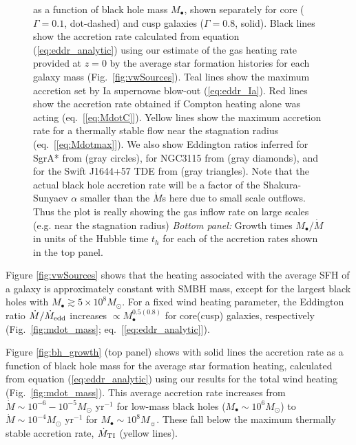 \documentclass[usenatbib,fleqn]{mn2e}
\newcommand{\Mdot}{\dot{M}}
\newcommand{\Mbh}[1][]{M_{\bullet#1}}
\renewcommand{\th}{t_h}
\begin{document}
\begin{figure}
{  as a function of black hole mass $M_{\bullet}$, shown separately for
  core ($\Gamma=0.1$, dot-dashed) and cusp galaxies ($\Gamma=0.8$,
  solid).  Black lines show the accretion rate calculated from
  equation (\ref{eq:eddr_analytic}) using our estimate of the gas
  heating rate provided at $z = 0$ by the average star formation
  histories for each galaxy mass (Fig.~\ref{fig:vwSources}).  Teal
  lines show the maximum accretion set by Ia supernovae blow-out
  (\ref{eq:eddr_Ia}).  Red lines show the accretion rate obtained if
  Compton heating alone was acting (eq.~[\ref{eq:MdotC}]).  Yellow
  lines show the maximum accretion rate for a thermally stable flow
  near the stagnation radius (eq.~[\ref{eq:Mdotmax}]).  We also show
  Eddington ratios inferred for SgrA* from \citet{Quataert:2004a}
  (gray circles), for NGC3115 from \citet{ShcherbakovWong+:2014a}
  (gray diamonds), and for the Swift J1644+57 TDE from
  \citet{BergerZauderer+:2012a} (gray triangles). Note that the actual
  black hole accretion rate will be a factor of the Shakura-Sunyaev
  $\alpha$ smaller than the $\Mdot$s here due to small scale
  outflows. Thus the plot is really showing the gas inflow rate on
  large scales (e.g. near the stagnation radius) {\it Bottom panel:} Growth
  times $\Mbh/\Mdot$ in units of the Hubble time $\th$ for each of the
  accretion rates shown in the top panel.}
\end{figure}

Figure \ref{fig:vwSources} shows that the heating associated with the
average SFH of a galaxy is approximately constant
with SMBH mass, except for the largest black holes with $M_{\bullet}
\gtrsim 5\times 10^{8}M_{\odot}$.  For a fixed wind heating parameter,
the Eddington ratio $\dot{M}/\dot{M}_{\rm edd}$ increases $\propto
M_{\bullet}^{0.5(0.8)}$ for core(cusp) galaxies, respectively
(Fig.~\ref{fig:mdot_mass}; eq.~[\ref{eq:eddr_analytic}]).

Figure \ref{fig:bh_growth} (top panel) shows with solid lines the
accretion rate as a function of black hole mass for the average star
formation heating, calculated from equation (\ref{eq:eddr_analytic})
using our results for the total wind heating
(Fig.~\ref{fig:mdot_mass}).  This average accretion rate increases
from $\dot{M} \sim 10^{-6}-10^{-5}M_{\odot}$ yr$^{-1}$ for low-mass
black holes ($M_{\bullet} \sim 10^{6}M_{\odot}$) to $\dot{M} \sim
10^{-4}M_{\odot}$ yr$^{-1}$ for $M_{\bullet} \sim 10^{8}M_{\sun}$.
These fall below the maximum thermally stable accretion rate,
$\dot{M}_{\rm TI}$ (yellow lines).
\end{document}
